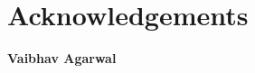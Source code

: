 \chapter*{Acknowledgements}


\vskip 0.4cm
\begin{flushright}
{\bf Vaibhav Agarwal}
\end{flushright}

\clearpage
\thispagestyle{empty}
~\clearpage 
